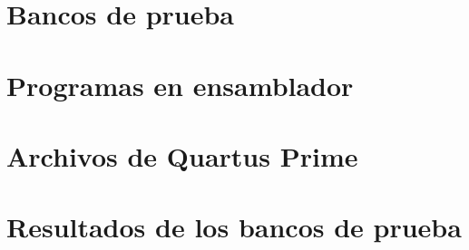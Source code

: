 \newpage
\section{Bancos de prueba}\label{ap:tbs}





\newpage
\section{Programas en ensamblador}\label{ap:programas}





\newpage
\section{Archivos de Quartus Prime}\label{ap:quartus}



\newpage
\section{Resultados de los bancos de prueba}\label{ap:logs}






